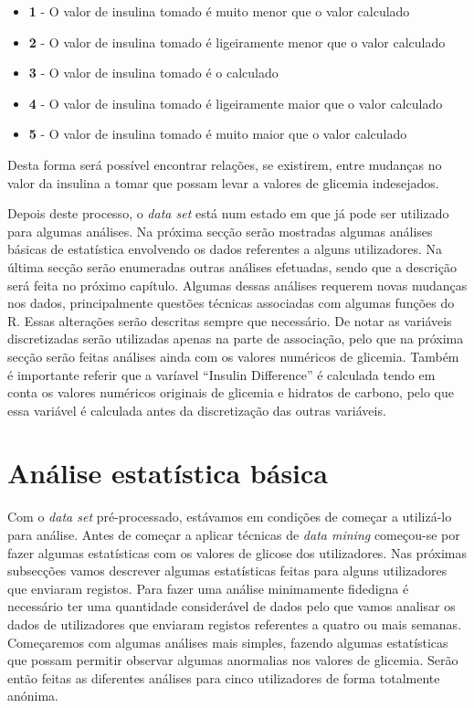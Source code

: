 \begin{itemize}
\item \textbf{1} - O valor de insulina tomado é muito menor que o valor calculado
\item \textbf{2} - O valor de insulina tomado é ligeiramente menor que o valor calculado
\item \textbf{3} - O valor de insulina tomado é o calculado
\item \textbf{4} - O valor de insulina tomado é ligeiramente maior que o valor calculado
\item \textbf{5} - O valor de insulina tomado é muito maior que o valor calculado
\end{itemize}
Desta forma será possível encontrar relações, se existirem, entre mudanças no valor da insulina a tomar que possam levar a valores de glicemia indesejados. 


Depois deste processo, o \textit{data set} está num estado em que já pode ser utilizado para algumas análises. Na próxima secção serão mostradas algumas análises básicas de estatística envolvendo os dados referentes a alguns utilizadores. Na última secção serão enumeradas outras análises efetuadas, sendo que a descrição será feita no próximo capítulo. Algumas dessas análises requerem novas mudanças nos dados, principalmente questões técnicas associadas com algumas funções do R. Essas alterações serão descritas sempre que necessário. De notar as variáveis discretizadas serão utilizadas apenas na parte de associação, pelo que na próxima secção serão feitas análises ainda com os valores numéricos de glicemia. Também é importante referir que a varíavel ``Insulin \textunderscore Difference'' é calculada tendo em conta os valores numéricos originais de glicemia e hidratos de carbono, pelo que essa variável é calculada antes da discretização das outras variáveis. 

\section{Análise estatística básica}

Com o \textit{data set} pré-processado, estávamos em condições de começar a utilizá-lo para análise. Antes de começar a aplicar técnicas de \textit{data mining} começou-se por fazer algumas estatísticas com os valores de glicose dos utilizadores. Nas próximas subsecções vamos descrever algumas estatísticas feitas para alguns utilizadores que enviaram registos. Para fazer uma análise minimamente fidedigna é necessário ter uma quantidade considerável de dados pelo que vamos analisar os dados de utilizadores que enviaram registos referentes a quatro ou mais semanas. Começaremos com algumas análises mais simples, fazendo algumas estatísticas que possam permitir observar algumas anormalias nos valores de glicemia. Serão então feitas as diferentes análises para cinco utilizadores de forma totalmente anónima.


